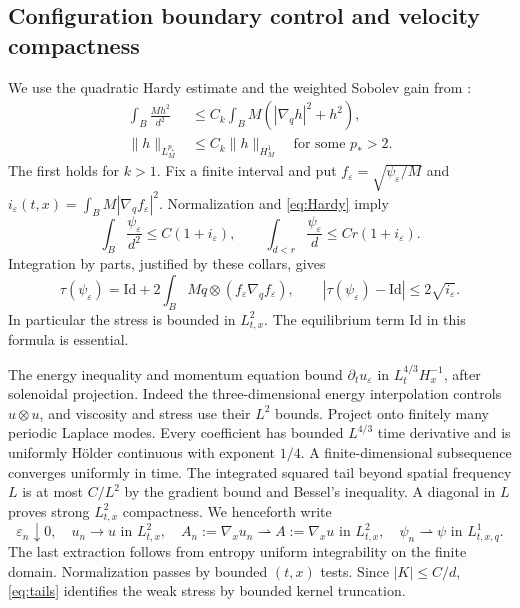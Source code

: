 \documentclass[11pt]{article}
\numberwithin{equation}{section}
\newcommand{\grad}{\nabla}
\newcommand{\Id}{\mathrm{Id}}
\newcommand{\weak}{\rightharpoonup}
\begin{document}
\subsection{Configuration boundary control and velocity compactness}
We use the quadratic Hardy estimate and the weighted Sobolev gain from
\cite[Lemma~3.2(ii), Proposition~3.7]{Masmoudi}:
\begin{align}
 \int_B\frac{Mh^2}{d^2}&\leq C_k\int_BM(|\grad_qh|^2+h^2),\label{eq:Hardy}\\
 \|h\|_{L^{p_*}_M}&\leq C_k\|h\|_{H^1_M}
       \quad\text{for some }p_*>2.\label{eq:Sobolev}
\end{align}
The first holds for $k>1$. Fix a finite interval and put
$f_\varepsilon=\sqrt{\psi_\varepsilon/M}$ and
$i_\varepsilon(t,x)=\int_BM|\grad_qf_\varepsilon|^2$.
Normalization and \eqref{eq:Hardy} imply
\begin{equation}\label{eq:tails}
 \int_B\frac{\psi_\varepsilon}{d^2}\leq C(1+i_\varepsilon),\qquad
 \int_{d<r}\frac{\psi_\varepsilon}{d}\leq Cr(1+i_\varepsilon).
\end{equation}
Integration by parts, justified by these collars, gives
\begin{equation}\label{eq:tauFisher}
 \tau(\psi_\varepsilon)=\Id+
 2\int_BM q\otimes(f_\varepsilon\grad_qf_\varepsilon),\qquad
 |\tau(\psi_\varepsilon)-\Id|\leq2\sqrt{i_\varepsilon}.
\end{equation}
In particular the stress is bounded in $L^2_{t,x}$. The equilibrium term
$\Id$ in this formula is essential.

The energy inequality and momentum equation bound
$\partial_tu_\varepsilon$ in $L^{4/3}_tH^{-1}_x$, after solenoidal projection.
Indeed the three-dimensional energy interpolation controls $u\otimes u$,
and viscosity and stress use their $L^2$ bounds. Project onto finitely many
periodic Laplace modes. Every coefficient has bounded $L^{4/3}$ time
derivative and is uniformly H\"older continuous with exponent $1/4$.
A finite-dimensional subsequence converges uniformly in time. The integrated
squared tail beyond spatial frequency $L$ is at most $C/L^2$ by the gradient
bound and Bessel's inequality. A diagonal in $L$ proves strong $L^2_{t,x}$
compactness. We henceforth write
\begin{equation}\label{eq:weakstart}
 \varepsilon_n\downarrow0,\quad u_n\to u\text{ in }L^2_{t,x},\quad
 A_n:=\grad_xu_n\weak A:=\grad_xu\text{ in }L^2_{t,x},\quad
 \psi_n\weak\psi\text{ in }L^1_{t,x,q}.
\end{equation}
The last extraction follows from entropy uniform integrability on the finite
domain. Normalization passes by bounded $(t,x)$ tests. Since $|K|\leq C/d$,
\eqref{eq:tails} identifies the weak stress by bounded kernel truncation.
\end{document}
